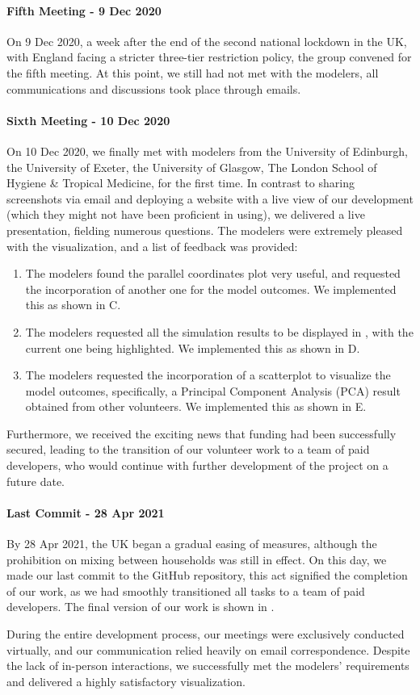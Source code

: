 \paragraph{Fifth Meeting - 9 Dec 2020}
On 9 Dec 2020, a week after the end of the second national lockdown in the UK, with England facing a stricter three-tier restriction policy, the group convened for the fifth meeting.
At this point, we still had not met with the modelers, all communications and discussions took place through emails.

\paragraph{Sixth Meeting - 10 Dec 2020}
On 10 Dec 2020, we finally met with modelers from the University of Edinburgh, the University of Exeter, the University of Glasgow, The London School of Hygiene \& Tropical Medicine, for the first time.
In contrast to sharing screenshots via email and deploying a website with a live view of our development (which they might not have been proficient in using), we delivered a live presentation, fielding numerous questions.
The modelers were extremely pleased with the visualization, and a list of feedback was provided:
\begin{enumerate}
    \item The modelers found the parallel coordinates plot very useful, and requested the incorporation of another one for the model outcomes. We implemented this as shown in C.
    \item The modelers requested all the simulation results to be displayed in , with the current one being highlighted. We implemented this as shown in D.
    \item The modelers requested the incorporation of a scatterplot to visualize the model outcomes, specifically, a Principal Component Analysis (PCA) result obtained from other volunteers. We implemented this as shown in E.
\end{enumerate}

Furthermore, we received the exciting news that funding had been successfully secured, leading to the transition of our volunteer work to a team of paid developers, who would continue with further development of the project on a future date.

\paragraph{Last Commit - 28 Apr 2021}
By 28 Apr 2021, the UK began a gradual easing of measures, although the prohibition on mixing between households was still in effect.
On this day, we made our last commit to the GitHub repository, this act signified the completion of our work, as we had smoothly transitioned all tasks to a team of paid developers.
The final version of our work is shown in .

During the entire development process, our meetings were exclusively conducted virtually, and our communication relied heavily on email correspondence.
Despite the lack of in-person interactions, we successfully met the modelers' requirements and delivered a highly satisfactory visualization.
